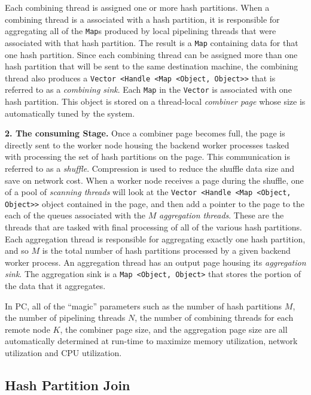 Each combining thread is assigned one or more hash partitions.  When a combining thread
is a associated with a hash partition, it is responsible for 
aggregating all of the \texttt{Map}s produced by local pipelining threads that were associated with that hash partition.
The result is a 
\texttt{Map} containing data for that one hash partition.  Since each combining
thread can be assigned more than one hash partition that will be sent to the same destination machine,
the combining thread also produces a \texttt{Vector <Handle <Map <Object, Object>>} that is referred to as a \emph{combining sink}.
Each \texttt{Map} in the \texttt{Vector} is associated with one hash partition.
This object is stored on a thread-local \emph{combiner page} whose size is automatically tuned by the system.

\vspace{5pt}
{\bf 2. The consuming Stage.}
Once a combiner page becomes full, the page is directly sent to the worker node housing the
backend worker processes tasked with processing the set of hash partitions on the page.
This communication is referred to as a \emph{shuffle}.  
Compression is used to reduce the shuffle data size and save on network cost.
When a worker node receives a page during the shuffle, one of a pool of \emph{scanning threads} will look at the 
\texttt{Vector <Handle <Map <Object, Object>>} object contained in the page, and then add a pointer to the page
to the each of the queues associated with the $M$ \emph{aggregation threads}.  These are the threads
that are tasked with final processing of all of the various hash partitions.
Each aggregation thread is responsible for aggregating exactly 
one hash partition, and so $M$ is the total number of hash partitions processed by a given backend worker process.
An aggregation thread has an output page housing its \emph{aggregation sink}.  The aggregation sink is a \texttt{Map <Object, Object>} that stores the portion of the
data that it aggregates.

 
In PC, all of the ``magic'' parameters such as the number of hash partitions $M$, 
the number of pipelining threads $N$, 
the number of combining threads for each remote node $K$, 
the combiner page size, and the aggregation page size are all automatically 
determined at run-time to maximize memory utilization, network utilization and CPU utilization. 

\subsection{Hash Partition Join}

